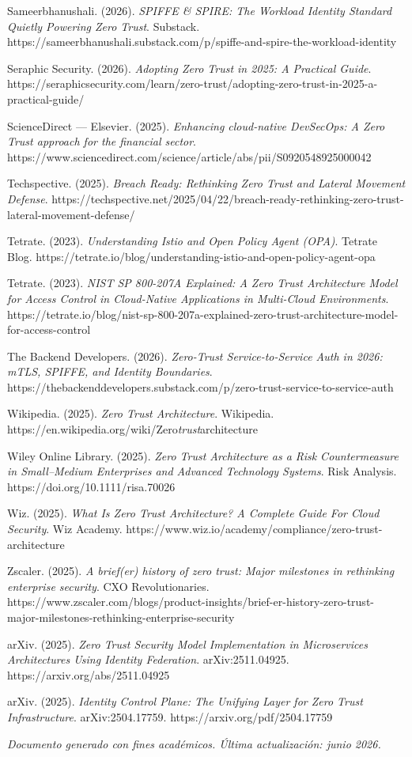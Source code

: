 \documentclass[12pt,a4paper]{article}
\begin{document}
Sameerbhanushali. (2026). \textit{SPIFFE \& SPIRE: The Workload Identity Standard Quietly Powering Zero Trust}. Substack. https://sameerbhanushali.substack.com/p/spiffe-and-spire-the-workload-identity

Seraphic Security. (2026). \textit{Adopting Zero Trust in 2025: A Practical Guide}. https://seraphicsecurity.com/learn/zero-trust/adopting-zero-trust-in-2025-a-practical-guide/

ScienceDirect — Elsevier. (2025). \textit{Enhancing cloud-native DevSecOps: A Zero Trust approach for the financial sector}. https://www.sciencedirect.com/science/article/abs/pii/S0920548925000042

Techspective. (2025). \textit{Breach Ready: Rethinking Zero Trust and Lateral Movement Defense}. https://techspective.net/2025/04/22/breach-ready-rethinking-zero-trust-lateral-movement-defense/

Tetrate. (2023). \textit{Understanding Istio and Open Policy Agent (OPA)}. Tetrate Blog. https://tetrate.io/blog/understanding-istio-and-open-policy-agent-opa

Tetrate. (2023). \textit{NIST SP 800-207A Explained: A Zero Trust Architecture Model for Access Control in Cloud-Native Applications in Multi-Cloud Environments}. https://tetrate.io/blog/nist-sp-800-207a-explained-zero-trust-architecture-model-for-access-control

The Backend Developers. (2026). \textit{Zero-Trust Service-to-Service Auth in 2026: mTLS, SPIFFE, and Identity Boundaries}. https://thebackenddevelopers.substack.com/p/zero-trust-service-to-service-auth

Wikipedia. (2025). \textit{Zero Trust Architecture}. Wikipedia. https://en.wikipedia.org/wiki/Zero\textit{trust}architecture

Wiley Online Library. (2025). \textit{Zero Trust Architecture as a Risk Countermeasure in Small–Medium Enterprises and Advanced Technology Systems}. Risk Analysis. https://doi.org/10.1111/risa.70026

Wiz. (2025). \textit{What Is Zero Trust Architecture? A Complete Guide For Cloud Security}. Wiz Academy. https://www.wiz.io/academy/compliance/zero-trust-architecture

Zscaler. (2025). \textit{A brief(er) history of zero trust: Major milestones in rethinking enterprise security}. CXO Revolutionaries. https://www.zscaler.com/blogs/product-insights/brief-er-history-zero-trust-major-milestones-rethinking-enterprise-security

arXiv. (2025). \textit{Zero Trust Security Model Implementation in Microservices Architectures Using Identity Federation}. arXiv:2511.04925. https://arxiv.org/abs/2511.04925

arXiv. (2025). \textit{Identity Control Plane: The Unifying Layer for Zero Trust Infrastructure}. arXiv:2504.17759. https://arxiv.org/pdf/2504.17759



\textit{Documento generado con fines académicos. Última actualización: junio 2026.}
\end{document}
